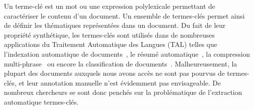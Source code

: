 

  Un terme-clé est un mot ou une expression polylexicale permettant de caractériser le contenu d'un document.
  Un ensemble de termes-clés permet ainsi de définir les thématiques représentées dans un document.
  Du fait de leur propriété synthétique, les termes-clés sont utilisés dans de nombreuses applications du Traitement Automatique des Langues (TAL) telles que l'indexation automatique de documents~\cite{medelyan2008smalltrainingset}, le résumé automatique~\cite{avanzo2005keyphrase}, la compression multi-phrase~\cite{boudin2013multisentencecompression} ou encore la classification de documents~\cite{han2007webdocumentclustering}.
  Malheureusement, la plupart des documents auxquels nous avons accès ne sont pas pourvus de termes-clés, et leur annotation manuelle n'est évidemment pas envisageable.
  De nombreux chercheurs se sont donc penchés sur la problématique de l'extraction automatique termes-clés.

